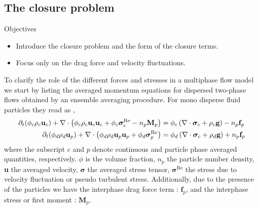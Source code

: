 \subsection{The closure problem}
Objectives
\begin{itemize}
    \item Introduce the closure problem and the form of the closure terms. 
    \item Focus only on the drag force and velocity fluctuations. 
\end{itemize}
To clarify the role of the different forces and stresses in a multiphase flow model we start by listing the averaged momentum equations for dispersed two-phase flows obtained by an ensemble averaging procedure.
For mono disperse fluid particles they read as \citep{zhang1997momentum,jackson1997locally},
\begin{align}
    \partial_t (\phi_c\rho_c \textbf{u}_c)
    + \mathbf{\nabla}\cdot \left(\phi_c\rho_c \textbf{u}_c\textbf{u}_c + \phi_c  \bm{\sigma}_c^{\text{Re}} - n_p\textbf{M}_p \right)
    &= \phi_c 
    \left(\mathbf{\nabla}\cdot \bm{\sigma}_c
    + \rho_c \textbf{g}\right)
    - n_p \textbf{f}_p 
    \label{eq:dt_uc}
    \\
    \partial_t (\phi_d\rho_d \textbf{u}_p)
    + \mathbf{\nabla}\cdot \left(\phi_d\rho_d \textbf{u}_p\textbf{u}_p+ \phi_d \bm{\sigma}_p^{\text{Re}}\right)
    &= 
    \phi_d \left(\mathbf{\nabla}\cdot \bm{\sigma}_c
    + \rho_d \textbf{g}\right)
    + n_p \textbf{f}_p 
    \label{eq:dy_up}
\end{align}
where the subscript $c$ and $p$ denote continuous and particle phase averaged quantities, respectively.
$\phi$ is the volume fraction, $n_p$ the particle number density, \textbf{u} the averaged velocity, $\bm{\sigma}$ the averaged stress tensor, $\bm{\sigma}^{\text{Re}}$ the stress due to velocity fluctuation or pseudo turbulent stress.
Additionally, due to the presence of the particles we have the interphase drag force term : $\textbf{f}_p$, and the interphase stress or first moment : $\textbf{M}_p$. 


